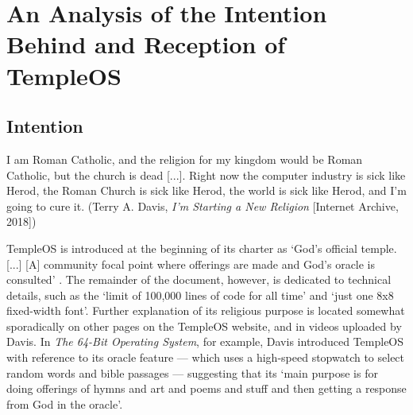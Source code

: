 \documentclass[Draft.tex]{subfiles}
\begin{document}
\chapter{An Analysis of the Intention Behind and Reception of TempleOS}

\section*{Intention}

\begin{displayquote}
  I am Roman Catholic, and the religion for my kingdom
  would be Roman Catholic, but the church is dead [...].
  Right now the computer industry is sick like Herod,
  the Roman Church is sick like Herod,
  the world is sick like Herod, and I'm going to cure it.
	(Terry A. Davis, \textit{I'm Starting a New Religion} [Internet Archive, 2018])
\end{displayquote}

TempleOS is introduced at the beginning of its charter as
`God's official temple. [...] [A] community focal point
where offerings are made and God's oracle is consulted' \parencite{Charter}.
The remainder of the document, however, is dedicated to technical details,
such as the `limit of 100,000 lines of code for all time'
and `just one 8x8 fixed-width font'.
Further explanation of its religious purpose is located somewhat sporadically
on other pages on the TempleOS website, and in videos uploaded by Davis.
In \textit{The 64-Bit Operating System}, for example,
Davis \parencite*{64-Bit} introduced TempleOS
with reference to its oracle feature --- which uses a high-speed
stopwatch to select random words and bible passages --- suggesting that its
`main purpose is for doing offerings of hymns and art and poems and stuff
and then getting a response from God in the oracle'.
\end{document}
